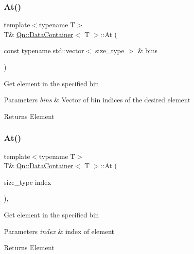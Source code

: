 \subsubsection{\texorpdfstring{At()}{At()}\hspace{0.1cm}{\footnotesize\ttfamily [2/4]}}
{\footnotesize\ttfamily template$<$typename T$>$ \\
T\& \mbox{\hyperlink{classQn_1_1DataContainer}{Qn\+::\+Data\+Container}}$<$ T $>$\+::At (\begin{DoxyParamCaption}\item[{const typename std\+::vector$<$ size\+\_\+type $>$ \&}]{bins }\end{DoxyParamCaption})\hspace{0.3cm}{\ttfamily [inline]}}

Get element in the specified bin 
\begin{DoxyParams}{Parameters}
{\em bins} & Vector of bin indices of the desired element \\
\hline
\end{DoxyParams}
\begin{DoxyReturn}{Returns}
Element 
\end{DoxyReturn}
\mbox{\label{classQn_1_1DataContainer_a929706074edc9dd3bcc89a68c307b9c3}} 
\subsubsection{\texorpdfstring{At()}{At()}\hspace{0.1cm}{\footnotesize\ttfamily [3/4]}}
{\footnotesize\ttfamily template$<$typename T$>$ \\
T\& \mbox{\hyperlink{classQn_1_1DataContainer}{Qn\+::\+Data\+Container}}$<$ T $>$\+::At (\begin{DoxyParamCaption}\item[{size\+\_\+type}]{index }\end{DoxyParamCaption})\hspace{0.3cm}{\ttfamily [inline]}, {\ttfamily [noexcept]}}

Get element in the specified bin 
\begin{DoxyParams}{Parameters}
{\em index} & index of element \\
\hline
\end{DoxyParams}
\begin{DoxyReturn}{Returns}
Element 
\end{DoxyReturn}
\mbox{\label{classQn_1_1DataContainer_af89617f2b9005713df9134dbd8417835}} 
